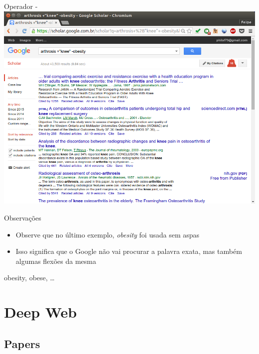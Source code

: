 \documentclass{beamer}
\begin{document}
\begin{frame}{Operador -}
  \includegraphics[height=.85\textheight]{Busca/google-fu-plusminus}
\end{frame}

\begin{frame}{Observações}
  \begin{itemize}
  \item Observe que no último exemplo, {\em obesity} foi usada sem
    aspas
  \item Isso significa que o Google não vai procurar a palavra
    \alert{exata}, mas também algumas flexões da mesma
  \end{itemize}
  \begin{example}
    obesity, obese, \ldots
  \end{example}
\end{frame}

\section{Deep Web}

\subsection{Papers}
\end{document}
